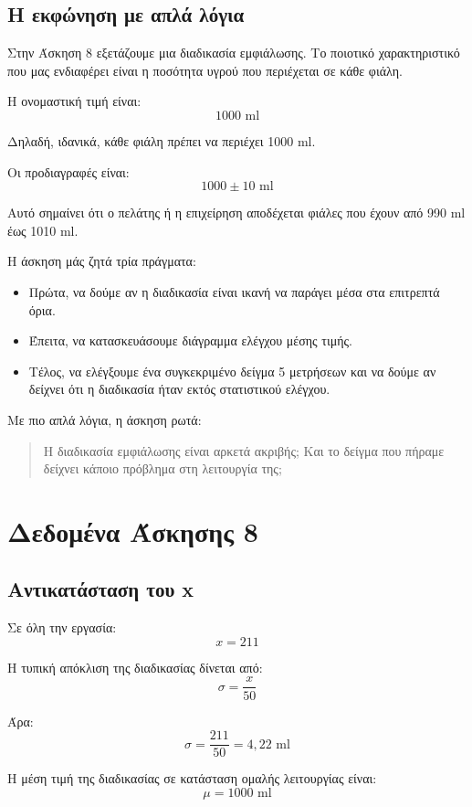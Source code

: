 \documentclass[12pt,a4paper]{article}
\begin{document}
\subsection{Η εκφώνηση με απλά λόγια}

Στην Άσκηση 8 εξετάζουμε μια διαδικασία εμφιάλωσης. Το ποιοτικό χαρακτηριστικό που μας ενδιαφέρει είναι η ποσότητα υγρού που περιέχεται σε κάθε φιάλη.

Η ονομαστική τιμή είναι:
\[
1000 \text{ ml}
\]

Δηλαδή, ιδανικά, κάθε φιάλη πρέπει να περιέχει 1000 ml.

Οι προδιαγραφές είναι:
\[
1000 \pm 10 \text{ ml}
\]

Αυτό σημαίνει ότι ο πελάτης ή η επιχείρηση αποδέχεται φιάλες που έχουν από 990 ml έως 1010 ml.

Η άσκηση μάς ζητά τρία πράγματα:

\begin{itemize}
    \item Πρώτα, να δούμε αν η διαδικασία είναι ικανή να παράγει μέσα στα επιτρεπτά όρια.
    \item Έπειτα, να κατασκευάσουμε διάγραμμα ελέγχου μέσης τιμής.
    \item Τέλος, να ελέγξουμε ένα συγκεκριμένο δείγμα 5 μετρήσεων και να δούμε αν δείχνει ότι η διαδικασία ήταν εκτός στατιστικού ελέγχου.
\end{itemize}

Με πιο απλά λόγια, η άσκηση ρωτά:

\begin{quote}
Η διαδικασία εμφιάλωσης είναι αρκετά ακριβής; Και το δείγμα που πήραμε δείχνει κάποιο πρόβλημα στη λειτουργία της;
\end{quote}

\section{Δεδομένα Άσκησης 8}

\subsection{Αντικατάσταση του x}

Σε όλη την εργασία:
\[
x=211
\]

Η τυπική απόκλιση της διαδικασίας δίνεται από:
\[
\sigma=\frac{x}{50}
\]

Άρα:
\[
\sigma=\frac{211}{50}=4{,}22 \text{ ml}
\]

Η μέση τιμή της διαδικασίας σε κατάσταση ομαλής λειτουργίας είναι:
\[
\mu=1000 \text{ ml}
\]
\end{document}
